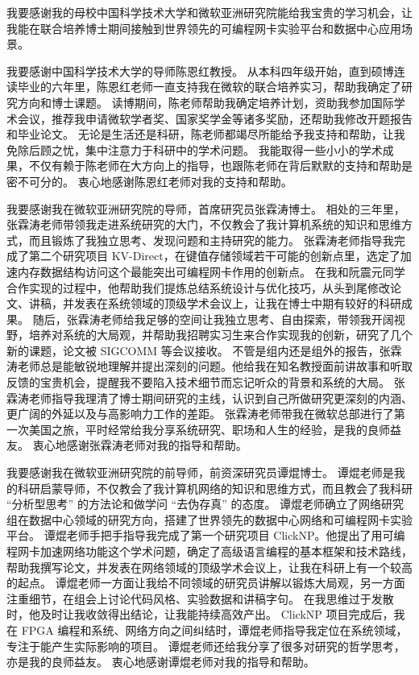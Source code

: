 
\begin{acknowledgements}

我要感谢我的母校中国科学技术⼤学和微软亚洲研究院能给我宝贵的学习机会，让我能在联合培养博士期间接触到世界领先的可编程网卡实验平台和数据中心应用场景。

我要感谢中国科学技术⼤学的导师陈恩红教授。
从本科四年级开始，直到硕博连读毕业的六年里，陈恩红老师一直支持我在微软的联合培养实习，帮助我确定了研究方向和博士课题。
读博期间，陈老师帮助我确定培养计划，资助我参加国际学术会议，推荐我申请微软学者奖、国家奖学金等诸多奖励，还帮助我修改开题报告和毕业论文。
无论是生活还是科研，陈老师都竭尽所能给予我⽀持和帮助，让我免除后顾之忧，集中注意⼒于科研中的学术问题。
我能取得一些小小的学术成果，不仅有赖于陈⽼师在大方向上的指导，也跟陈老师在背后默默的⽀持和帮助是密不可分的。
衷心地感谢陈恩红老师对我的支持和帮助。

我要感谢我在微软亚洲研究院的导师，首席研究员张霖涛博士。
相处的三年里，张霖涛老师带领我走进系统研究的大门，不仅教会了我计算机系统的知识和思维方式，而且锻炼了我独立思考、发现问题和主持研究的能力。
张霖涛老师指导我完成了第二个研究项目 KV-Direct，在键值存储领域若干可能的创新点里，选定了加速内存数据结构访问这个最能突出可编程网卡作用的创新点。
在我和阮震元同学合作实现的过程中，他帮助我们提炼总结系统设计与优化技巧，从头到尾修改论文、讲稿，并发表在系统领域的顶级学术会议上，让我在博士中期有较好的科研成果。
随后，张霖涛老师给我足够的空间让我独立思考、自由探索，带领我开阔视野，培养对系统的大局观，并帮助我招聘实习生来合作实现我的创新，研究了几个新的课题，论文被 SIGCOMM 等会议接收。
不管是组内还是组外的报告，张霖涛老师总是能敏锐地理解并提出深刻的问题。他给我在知名教授面前讲故事和听取反馈的宝贵机会，提醒我不要陷入技术细节而忘记听众的背景和系统的大局。
张霖涛老师指导我理清了博士期间研究的主线，认识到自己所做研究更深刻的内涵、更广阔的外延以及与高影响力工作的差距。
张霖涛老师带我在微软总部进行了第一次美国之旅，平时经常给我分享系统研究、职场和人生的经验，是我的良师益友。
衷心地感谢张霖涛老师对我的指导和帮助。

我要感谢我在微软亚洲研究院的前导师，前资深研究员谭焜博⼠。
谭焜老师是我的科研启蒙导师，不仅教会了我计算机⽹络的知识和思维⽅式，⽽且教会了我科研 ``分析型思考'' 的⽅法论和做学问 ``去伪存真'' 的态度。
谭焜老师确立了网络研究组在数据中心领域的研究方向，搭建了世界领先的数据中心网络和可编程网卡实验平台。
谭焜老师手把手指导我完成了第一个研究项目 ClickNP。他提出了用可编程网卡加速网络功能这个学术问题，确定了高级语言编程的基本框架和技术路线，帮助我撰写论文，并发表在网络领域的顶级学术会议上，让我在科研上有一个较高的起点。
谭焜老师一方面让我给不同领域的研究员讲解以锻炼大局观，另一方面注重细节，在组会上讨论代码风格、实验数据和讲稿字句。
在我思维过于发散时，他及时让我收敛得出结论，让我能持续高效产出。
ClickNP 项目完成后，我在 FPGA 编程和系统、网络方向之间纠结时，谭焜老师指导我定位在系统领域，专注于能产生实际影响的项目。
谭焜老师还给我分享了很多对研究的哲学思考，亦是我的良师益友。
衷⼼地感谢谭焜⽼师对我的指导和帮助。


\end{acknowledgements}
